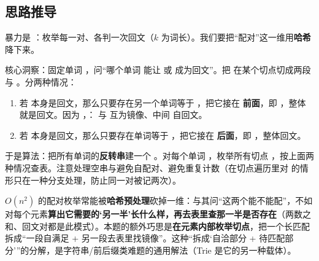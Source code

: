 \subsection*{思路推导}
暴力是 ：枚举每一对、各判一次回文（$k$ 为词长）。我们要把“配对”这一维用\textbf{哈希}降下来。

核心洞察：固定单词 ，问“哪个单词  能让  或  成为回文”。把  在某个切点切成两段 \code{left = w[0..i)} 与 。分两种情况：
\begin{enumerate}
  \item 若  本身是回文，那么只要存在另一个单词等于 ，把它接在  \textbf{前面}，即 ，整体就是回文。因为 ，： 与  互为镜像、中间  自回文。
  \item 若  本身是回文，那么只要存在单词等于 ，把它接在  \textbf{后面}，即 ，整体回文。
\end{enumerate}
于是算法：把所有单词的\textbf{反转串}建一个 。对每个单词 ，枚举所有切点 ，按上面两种情况查表。注意处理空串与避免自配对、避免重复计数（在切点遍历里对  的情形只在一种分支处理，防止同一对被记两次）。

\begin{idea}[把“配对搜索”转成“查表”：拆分 + 反转 + 哈希]
$O(n^2)$ 的配对枚举常能被\textbf{哈希预处理}砍掉一维：与其问“这两个能不能配”，不如对每个元素\textbf{算出它需要的‘另一半’长什么样，再去表里查那一半是否存在}（两数之和、回文对都是此模式）。本题的额外巧思是\textbf{在元素内部枚举切点}，把一个长匹配拆成“一段自满足 + 另一段去表里找镜像”。这种“拆成‘自洽部分 + 待匹配部分’”的分解，是字符串/前后缀类难题的通用解法（Trie 是它的另一种载体）。
\end{idea}

